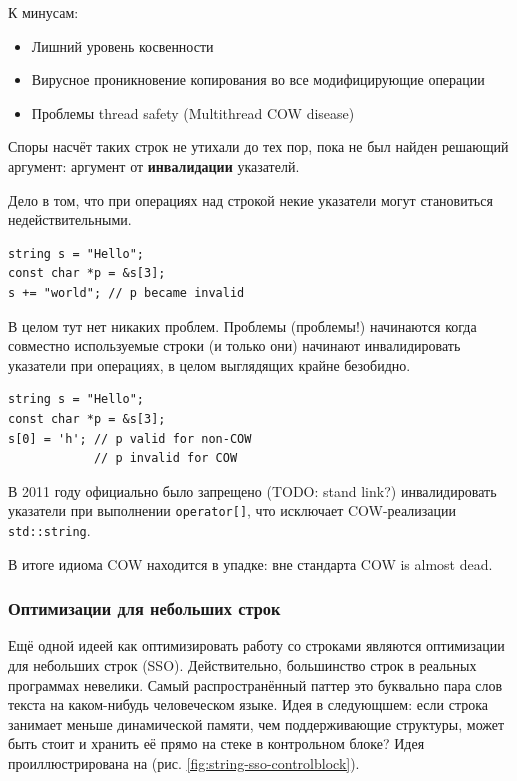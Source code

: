\documentclass[a4paper,12pt,oneside]{article}
\begin{document}
К минусам:

\begin{itemize}
\item Лишний уровень косвенности
\item Вирусное проникновение копирования во все модифицирующие операции
\item Проблемы thread safety (Multithread COW disease)
\end{itemize}

Споры насчёт таких строк не утихали до тех пор, пока не был найден решающий аргумент: аргумент от \textbf{инвалидации} указателй. 

Дело в том, что при операциях над строкой некие указатели могут становиться недействительными.

\begin{lstlisting}
string s = "Hello";
const char *p = &s[3];
s += "world"; // p became invalid
\end{lstlisting}

В целом тут нет никаких проблем. Проблемы (проблемы!) начинаются когда совместно используемые строки (и только они) начинают инвалидировать указатели при операциях, в целом выглядящих крайне безобидно.

\begin{lstlisting}
string s = "Hello";
const char *p = &s[3];
s[0] = 'h'; // p valid for non-COW
            // p invalid for COW
\end{lstlisting}

В 2011 году официально было запрещено (TODO: stand link?) инвалидировать указатели при выполнении \lstinline!operator[]!, что исключает COW-реализации \lstinline!std::string!.

В итоге идиома COW находится в упадке: вне стандарта COW is almost dead.

\subsubsection{Оптимизации для небольших строк}\label{subsub:sso}

Ещё одной идеей как оптимизировать работу со строками являются оптимизации для небольших строк (SSO). Действительно, большинство строк в реальных программах невелики. Самый распространённый паттер это буквально пара слов текста на каком-нибудь человеческом языке. Идея в следующшем: если строка занимает меньше динамической памяти, чем поддерживающие структуры, может быть стоит и хранить её прямо на стеке в контрольном блоке? Идея проиллюстрирована на (рис. \ref{fig:string-sso-controlblock}).
\end{document}
